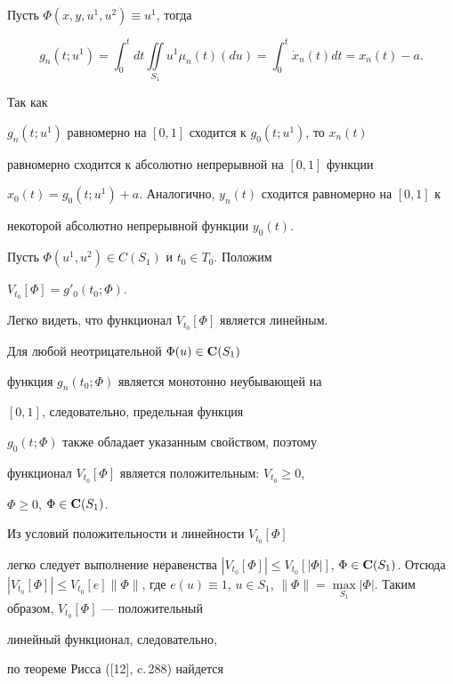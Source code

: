 \begin{pf}
Пусть $\Phi(x,y, u^1,u^2) \equiv u^1$, тогда


\begin{equation}


g_n(t;u^1) = \int_{0}^{t} dt \iint\limits_{S_1} u^1\mu_n(t)(du)=


\int_{0}^{t} \Dot{x}_n(t)dt=x_n(t)-a.


\end{equation}


Так как


$g_n(t;u^1)$ равномерно на $[0,1]$ сходится к $g_0(t;u^1)$, то $x_n(t)$


равномерно сходится к абсолютно непрерывной на $[0,1]$ функции


$x_0(t)=g_0(t;u^1)+a$. Аналогично, $y_n(t)$ сходится равномерно на $[0,1]$ к


некоторой абсолютно непрерывной функции $y_0(t)$.





Пусть $\Phi(u^1,u^2)\in C(S_1)$ и $t_0\in T_0$. Положим


$V_{t_0}[\Phi]=g'_0 (t_0;\Phi)$.


Легко видеть, что функционал $V_{t_0}[\Phi]$ является линейным.





Для любой неотрицательной $\Phi(u)\in {\bold{C}}(S_1)$


функция $g_n (t_0;\Phi)$ является монотонно неубывающей на


$[0,1]$, следовательно, предельная функция


$g_0 (t;\Phi)$ также обладает указанным свойством, поэтому


функционал $V_{t_0}[\Phi]$ является положительным: $V_{t_0} \geq 0$,


$\Phi\geq 0$, $\Phi\in {\bold{C}}(S_1)$.


Из условий положительности и линейности $V_{t_0}[\Phi]$


легко следует выполнение неравенства $| V_{t_0}[\Phi]| \leq


V_{t_0}[|\Phi|]$, $\Phi\in {\bold{C}}(S_1)$. Отсюда $| V_{t_0}[\Phi]| \leq


V_{t_0}[e]\|\Phi\|$, где $e(u) \equiv 1$, $u\in S_1$, $\|\Phi\|=


\max\limits_{S_1}|\Phi|$. Таким образом, $V_{t_0}[\Phi]$ --- положительный


линейный функционал, следовательно,


по теореме Рисса ([12], c.\,288) найдется



\end{pf}
